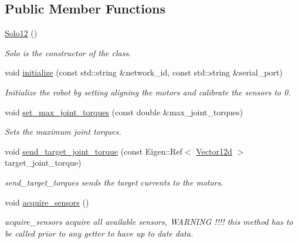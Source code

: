 \subsection*{Public Member Functions}
\begin{DoxyCompactItemize}
\item 
\hyperlink{classblmc__robots_1_1Solo12_a9be95c29e80dca13a2dafa8a0f82eec5}{Solo12} ()
\begin{DoxyCompactList}\small\item\em Solo is the constructor of the class. \end{DoxyCompactList}\item 
void \hyperlink{classblmc__robots_1_1Solo12_ae3b1480bc12a079939b627950d55f66a}{initialize} (const std\+::string \&network\+\_\+id, const std\+::string \&serial\+\_\+port)
\begin{DoxyCompactList}\small\item\em Initialize the robot by setting aligning the motors and calibrate the sensors to 0. \end{DoxyCompactList}\item 
\mbox{\label{classblmc__robots_1_1Solo12_a9f0d4a95fd4f82681f78dda1d519e5f9}} 
void \hyperlink{classblmc__robots_1_1Solo12_a9f0d4a95fd4f82681f78dda1d519e5f9}{set\+\_\+max\+\_\+joint\+\_\+torques} (const double \&max\+\_\+joint\+\_\+torques)
\begin{DoxyCompactList}\small\item\em Sets the maximum joint torques. \end{DoxyCompactList}\item 
\mbox{\label{classblmc__robots_1_1Solo12_a7f9bbd57bf8f0a9d54542c249c03fb47}} 
void \hyperlink{classblmc__robots_1_1Solo12_a7f9bbd57bf8f0a9d54542c249c03fb47}{send\+\_\+target\+\_\+joint\+\_\+torque} (const Eigen\+::\+Ref$<$ \hyperlink{common__header_8hpp_a80313eb420184518596e745eecf4b494}{Vector12d} $>$ target\+\_\+joint\+\_\+torque)
\begin{DoxyCompactList}\small\item\em send\+\_\+target\+\_\+torques sends the target currents to the motors. \end{DoxyCompactList}\item 
void \hyperlink{classblmc__robots_1_1Solo12_aad9581cdcb139a49dbfb4673f18f7968}{acquire\+\_\+sensors} ()
\begin{DoxyCompactList}\small\item\em acquire\+\_\+sensors acquire all available sensors, W\+A\+R\+N\+I\+NG !!!! this method has to be called prior to any getter to have up to date data. \end{DoxyCompactList}\item 

\end{DoxyCompactItemize}
